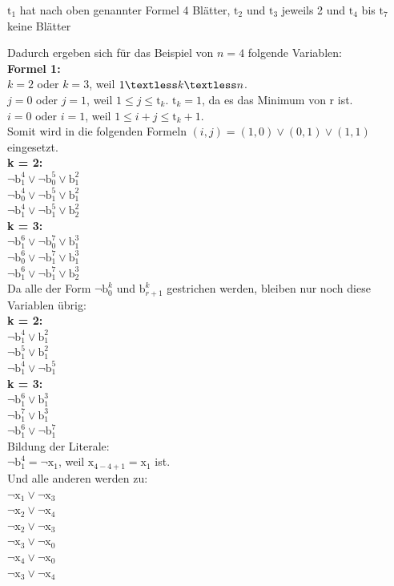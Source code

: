 \documentclass[a4,abstract=on]{scrartcl}
\begin{document}
$\text{t}_1$ hat nach oben genannter Formel 4 Blätter, $\text{t}_2$ und $\text{t}_3$ jeweils 2 und $\text{t}_4$ bis $\text{t}_7$ keine Blätter

Dadurch ergeben sich für das Beispiel von $n=4$ folgende Variablen:\\
\textbf{Formel 1:}\\
$k=2$ oder $k=3$, weil $1 \textless k \textless n$.\\
$j=0$ oder $j=1$, weil $1 \leq j \leq \text{t}_k$. $\text{t}_k = 1$, da es das Minimum von r ist.\\
$i=0$ oder $i=1$, weil $1\leq i+j \leq \text{t}_{k}+1$.\\
Somit wird in die folgenden Formeln $(i,j) = (1,0) \vee (0,1) \vee (1,1)$ eingesetzt.\\
\textbf{k = 2:}\\
$\neg \text{b}_1^4 \vee \neg \text{b}_0^5 \vee \text{b}_1^2$\\
$\neg \text{b}_0^4 \vee \neg \text{b}_1^5 \vee \text{b}_1^2$\\
$\neg \text{b}_1^4 \vee \neg \text{b}_1^5 \vee \text{b}_2^2$\\
\textbf{k = 3:}\\
$\neg \text{b}_1^6 \vee \neg \text{b}_0^7 \vee \text{b}_1^3$\\
$\neg \text{b}_0^6 \vee \neg \text{b}_1^7 \vee \text{b}_1^3$\\
$\neg \text{b}_1^6 \vee \neg \text{b}_1^7 \vee \text{b}_2^3$\\

Da alle der Form $\neg \text{b}_0^k$ und $\text{b}_{r+1}^k$  gestrichen werden, bleiben nur noch diese Variablen übrig:\\
\textbf{k = 2:}\\
$\neg \text{b}_1^4  \vee \text{b}_1^2$\\
$\neg \text{b}_1^5 \vee \text{b}_1^2$\\
$\neg \text{b}_1^4 \vee \neg \text{b}_1^5$\\
\textbf{k = 3:}\\
$\neg \text{b}_1^6 \vee \text{b}_1^3$\\
$\neg \text{b}_1^7 \vee \text{b}_1^3$\\
$\neg \text{b}_1^6 \vee \neg \text{b}_1^7 $\\

 Bildung der Literale:\\
$\neg \text{b}_1^4 = \neg \text{x}_1$, weil $\text{x}_{4-4+1}=\text{x}_1$ ist.\\
 Und alle anderen werden zu:\\
$ \neg \text{x}_1 \vee \neg \text{x}_3$\\
$\neg \text{x}_2 \vee \neg \text{x}_4$\\
$\neg \text{x}_2 \vee \neg \text{x}_3$\\
$\neg \text{x}_3 \vee \neg \text{x}_0$\\
$\neg \text{x}_4 \vee \neg \text{x}_0$\\
$\neg \text{x}_3 \vee \neg \text{x}_4$\\
\end{document}
